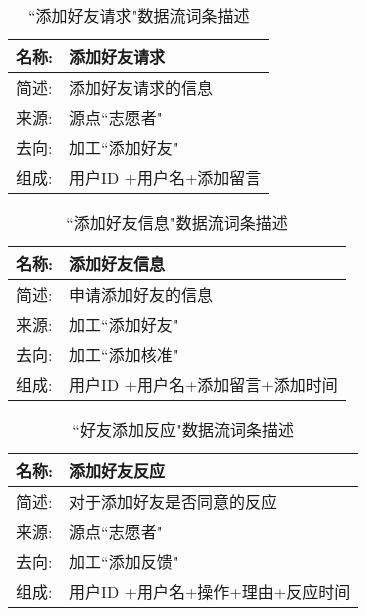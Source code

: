 \begin{table}[H]  
\caption{``添加好友请求"数据流词条描述}  
\begin{center}  
    \begin{tabular}{l p{11cm}} 
        \hline
        \quad 名称:  &  添加好友请求 \\
        \hline
        \quad 简述:  & 添加好友请求的信息 \\
        \hline
        \quad 来源:  & 源点``志愿者" \\
        \hline
        \quad 去向:  & 加工``添加好友" \\
        \hline
        \quad 组成:  & 用户ID +用户名+添加留言 \\
        \hline
    \end{tabular}
    \label{tab1}
\end{center}
\end{table}

\begin{table}[H]  
\caption{``添加好友信息"数据流词条描述}  
\begin{center}  
    \begin{tabular}{l p{11cm}} 
        \hline
        \quad 名称:  &   添加好友信息 \\
        \hline
        \quad 简述:  & 申请添加好友的信息 \\
        \hline
        \quad 来源:  & 加工``添加好友" \\
        \hline
        \quad 去向:  & 加工``添加核准" \\
        \hline
        \quad 组成:  & 用户ID +用户名+添加留言+添加时间 \\
        \hline
    \end{tabular}
    \label{tab1}
\end{center}
\end{table}

\begin{table}[H]  
\caption{``好友添加反应"数据流词条描述}  
\begin{center}  
    \begin{tabular}{l p{11cm}} 
        \hline
        \quad 名称:  &   添加好友反应 \\
        \hline
        \quad 简述:  & 对于添加好友是否同意的反应 \\
        \hline
        \quad 来源:  & 源点``志愿者" \\
        \hline
        \quad 去向:  & 加工``添加反馈" \\
        \hline
        \quad 组成:  & 用户ID +用户名+操作+{理由}+反应时间 \\
        \hline
    \end{tabular}
    \label{tab1}
\end{center}
\end{table}

